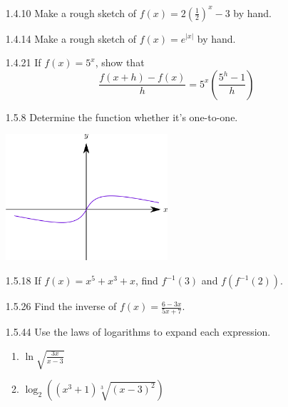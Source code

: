 \documentclass{article}
\begin{document}
\begin{enumerate}
    \item[1.4.10]
        Make a rough sketch of $\displaystyle f(x) = 2 \left(\frac{1}{2}\right)^{x} -3$ by hand.
        \vspace{6cm}

    \item[1.4.14]
        Make a rough sketch of $\displaystyle f(x) = e^{|x|}$ by hand.
        \vspace{6cm}


    \item[1.4.21]
        If $f(x) = 5^{x}$, show that
        \[
            \frac{f(x+h) - f(x)}{h} = 5^{x}\left( \frac{5^{h}-1}{h} \right)
        \]
    \newpage

    \item[1.5.8]
        Determine the function whether it's one-to-one.
        \begin{center}
            \includegraphics[width=6cm]{./png/1.5.8.png}
        \end{center}

        \vspace{3cm}

    \item[1.5.18]
        If $f(x) = x^{5} + x^{3} + x$,
        find $f^{-1}(3)$ and $f(f^{-1}(2))$.

        \vspace{6cm}


    \item[1.5.26]
        Find the inverse of $\displaystyle f(x) = \frac{6 - 3x}{5x + 7}$.

    \newpage

    \item[1.5.44]
        Use the laws of logarithms to expand each expression.

        \begin{enumerate}
            \item
                $\displaystyle \ln \sqrt{\frac{3x}{x-3}}$
            \item
                $\displaystyle \log_{2}\left( (x^{3}+1) \sqrt[3]{(x-3)^{2}}\right)$
        \end{enumerate}


\end{enumerate}
\end{document}
